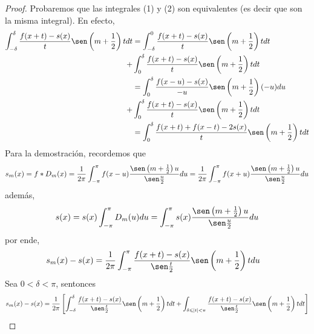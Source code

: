 \documentclass[12pt]{report}
\newcounter{it}
\theoremstyle{largebreak}
\renewcommand{\leq}{\ensuremath{\leqslant}}
\begin{document}
    \begin{proof}
        Probaremos que las integrales (1) y (2) son equivalentes (es decir que son la misma integral). En efecto,
        \begin{equation*}
            \begin{split}
                \int_{-\delta}^\delta \frac{f(x+t)-s(x)}{t}\sen\left(m+\frac{1}{2} \right)tdt&=\int_{-\delta}^0\frac{f(x+t)-s(x)}{t}\sen\left(m+\frac{1}{2} \right)tdt\\
                +&\int_0^\delta \frac{f(x+t)-s(x)}{t}\sen\left(m+\frac{1}{2} \right)tdt\\
                &=\int_0^\delta \frac{f(x-u)-s(x)}{-u}\sen\left(m+\frac{1}{2} \right)(-u)du\\
                +&\int_0^\delta \frac{f(x+t)-s(x)}{t}\sen\left(m+\frac{1}{2} \right)tdt\\
                &=\int_0^\delta\frac{f(x+t)+f(x-t)-2s(x)}{t}\sen\left( m+\frac{1}{2}\right)tdt\\
            \end{split}
        \end{equation*}
        Para la demostración, recordemos que
        \begin{equation*}
            s_m(x)=f*D_m(x)=\frac{1}{2\pi}\int_{-\pi}^{\pi}f(x-u)\frac{\sen\left(m+\frac{1}{2} \right)u}{\sen\frac{u}{2}}du=\frac{1}{2\pi}\int_{-\pi}^{\pi}f(x+u)\frac{\sen\left(m+\frac{1}{2} \right)u}{\sen\frac{u}{2}}du
        \end{equation*}
        además,
        \begin{equation*}
            s(x)=s(x)\int_{-\pi}^\pi D_m(u)du=\int_{-\pi}^{\pi}s(x)\frac{\sen\left(m+\frac{1}{2} \right)u}{\sen\frac{u}{2}}du
        \end{equation*}
        por ende,
        \begin{equation*}
            \begin{split}
                s_m(x)-s(x)&=\frac{1}{2\pi}\int_{-\pi}^{\pi}\frac{f(x+t)-s(x)}{\sen\frac{t}{2}}\sen\left(m+\frac{1}{2} \right)tdu
            \end{split}
        \end{equation*}
        Sea $0<\delta<\pi$, sentonces
        \begin{equation*}
            \begin{split}
                s_m(x)-s(x)&=\frac{1}{2\pi}\left[\int_{-\delta}^{\delta}\frac{f(x+t)-s(x)}{\sen\frac{t}{2}}\sen\left(m+\frac{1}{2} \right)tdt+\int_{\delta\leq|t|<\pi}\frac{f(x+t)-s(x)}{\sen\frac{t}{2}}\sen\left(m+\frac{1}{2} \right)tdt\right] \\

\end{split}
\end{equation*}
\end{proof}
\end{document}
